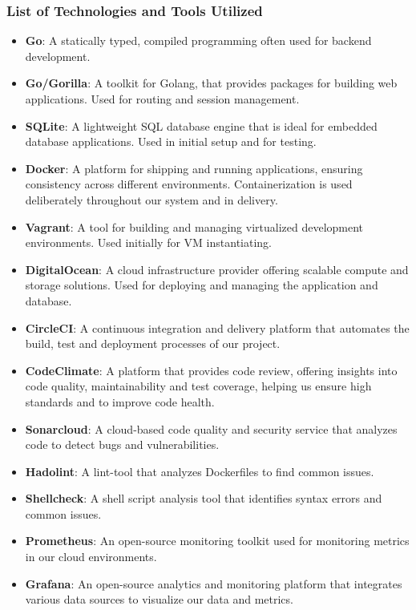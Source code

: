 \subsubsection*{List of Technologies and Tools Utilized}
\begin{multicols}{2}
    \begin{itemize}
        \item \textbf{Go}: A statically typed, compiled programming often used for backend development.
        \item \textbf{Go/Gorilla}: A toolkit for Golang, that provides packages for building web applications. Used for routing and session management.
        \item \textbf{SQLite}: A lightweight SQL database engine that is ideal for embedded database applications. Used in initial setup and for testing.
        \item \textbf{Docker}: A platform for shipping and running applications, ensuring consistency across different environments. Containerization is used deliberately throughout our system and in delivery.
        \item \textbf{Vagrant}: A tool for building and managing virtualized development environments. Used initially for VM instantiating.
        \item \textbf{DigitalOcean}: A cloud infrastructure provider offering scalable compute and storage solutions. Used for deploying and managing the application and database.
        \item \textbf{CircleCI}: A continuous integration and delivery platform that automates the build, test and deployment processes of our project.
        \item \textbf{CodeClimate}: A platform that provides code review, offering insights into code quality, maintainability and test coverage, helping us ensure high standards and to improve code health.
        \item \textbf{Sonarcloud}: A cloud-based code quality and security service that analyzes code to detect bugs and vulnerabilities.
        \item \textbf{Hadolint}: A lint-tool that analyzes Dockerfiles to find common issues.
        \item \textbf{Shellcheck}: A shell script analysis tool that identifies syntax errors and common issues.
        \item \textbf{Prometheus}: An open-source monitoring toolkit used for monitoring metrics in our cloud environments.
        \item \textbf{Grafana}: An open-source analytics and monitoring platform that integrates various data sources to visualize our data and metrics.

\end{itemize}
\end{multicols}
